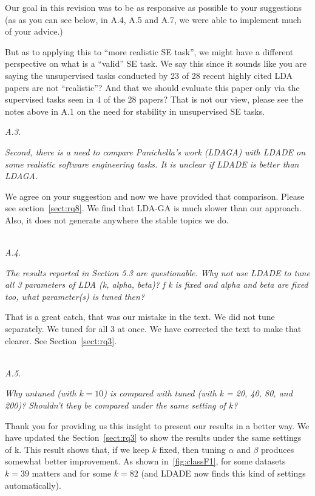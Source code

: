\documentclass[twocolumn,5p,sort&compress]{elsarticle}
\theoremstyle{break}
\begin{document}
Our goal in this revision was to be as responsive as possible to your suggestions (as as you can see below, in  A.4, A.5 and A.7, we were
able to implement much of your advice.) 


But as to applying this to ``more realistic SE task'',   we might have a different perspective on what is a ``valid'' SE task.
We say this since it
sounds like you are saying the unsupervised
tasks conducted by   23 of 28 recent highly cited LDA papers are not ``realistic''? And that we should
evaluate this paper only via the supervised tasks seen in 4 of the 28 papers?
That is not our view, please see the notes above in A.1 on the need for stability in unsupervised SE tasks.



\noindent
\textit{A.3.} 

\textit{Second, there is a need to compare Panichella's work (LDAGA) with LDADE on some realistic software engineering tasks. It is unclear if LDADE is better than LDAGA.\\}

We agree on your suggestion and now we have provided that comparison. Please see section~\ref{sect:rq8}. We find that  LDA-GA is much slower than our approach. Also, it does not generate anywhere the stable topics we do.

\noindent
\textit{\\A.4.}

\textit{The results reported in Section 5.3 are questionable. Why not use LDADE to tune all 3 parameters of LDA (k, alpha, beta)? f k is fixed and alpha and beta are fixed too, what parameter(s) is tuned then?\\}

 That is a great catch, that was our mistake in the text. We did not tune separately. We tuned for all 3 at once. We have corrected the text to make that clearer. See Section~\ref{sect:rq3}.

\noindent
\textit{\\A.5.}  

\textit{Why untuned (with $k = 10$) is compared with tuned (with k = 20, 40, 80, and 200)? Shouldn't they be compared under the same setting of $k$? \\}

Thank you for providing us this insight to present our results in a better way. We have updated the Section~\ref{sect:rq3} to show the results under the same settings of k. This result shows that, if we keep $k$ fixed, then tuning $\alpha$ and $\beta$ produces somewhat better improvement.  As shown in~\ref{fig:classF1}, for some datasets $k=39$ matters and for some $k=82$ (and LDADE now finds this kind of settings automatically).
\end{document}

